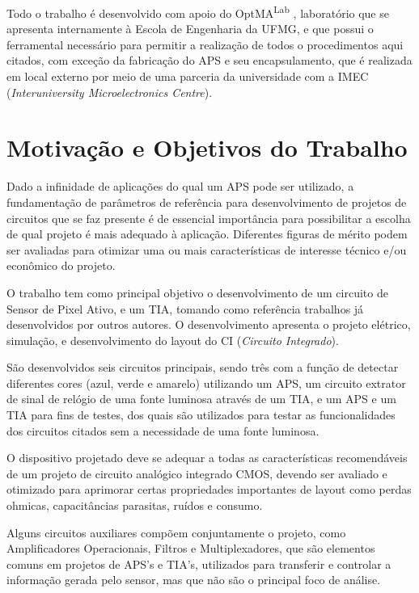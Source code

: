 Todo o trabalho é desenvolvido com apoio do OptMA\textsuperscript{Lab} , laboratório que se apresenta internamente à Escola de Engenharia da UFMG, e que possui o ferramental necessário para permitir a realização de todos o procedimentos aqui citados, com exceção da fabricação do APS e seu encapsulamento, que é realizada em local externo por meio de uma parceria da universidade com a IMEC (\textit{Interuniversity Microelectronics Centre}).

\section{Motivação e Objetivos do Trabalho}

Dado a infinidade de aplicações do qual um APS pode ser utilizado, a fundamentação de parâmetros de referência para desenvolvimento de projetos de circuitos que se faz presente é de essencial importância para possibilitar a escolha de qual projeto é mais adequado à aplicação. Diferentes figuras de mérito podem ser avaliadas para otimizar uma ou mais características de interesse técnico e/ou econômico do projeto.

O trabalho tem como principal objetivo o desenvolvimento de um circuito de Sensor de Pixel Ativo, e um TIA, tomando como referência trabalhos j\'a desenvolvidos por outros autores. O desenvolvimento apresenta o projeto elétrico, simulação, e desenvolvimento do layout do CI (\textit{Circuito Integrado}). 

São desenvolvidos seis circuitos principais, sendo três com a função de detectar diferentes cores (azul, verde e amarelo) utilizando um APS, um circuito extrator de sinal de relógio de uma fonte luminosa atrav\'es de um TIA, e um APS e um TIA para fins de testes, dos quais são utilizados para testar as funcionalidades dos circuitos citados sem a necessidade de uma fonte luminosa. 

O dispositivo projetado deve se adequar a todas as características recomendáveis de um projeto de circuito analógico integrado CMOS, devendo ser avaliado e otimizado para aprimorar certas propriedades importantes de layout como perdas ohmicas, capacitâncias parasitas, ruídos e consumo.

Alguns circuitos auxiliares compõem conjuntamente o projeto, como Amplificadores Operacionais, Filtros e Multiplexadores, que são elementos comuns em projetos de APS’s e TIA's, utilizados para transferir e controlar a informação gerada pelo sensor, mas que não são o principal foco de análise.

